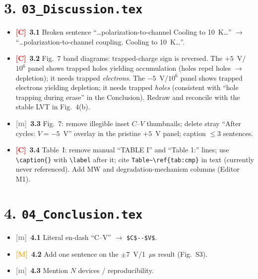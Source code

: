 \documentclass[10pt,a4paper]{article}
\newcommand{\C}{\textcolor{red}{\textbf{[C]}}}
\newcommand{\M}{\textcolor{orange}{\textbf{[M]}}}
\newcommand{\m}{\textcolor{gray}{\textbf{[m]}}}
\begin{document}
\section*{3. \texttt{03\_Discussion.tex}}
\begin{itemize}
\item \C\ \textbf{3.1} Broken sentence ``\ldots polarization-to-channel Cooling to 10~K\ldots'' $\rightarrow$ ``\ldots polarization-to-channel coupling. Cooling to 10~K\ldots''.
\item \C\ \textbf{3.2} Fig.~7 band diagrams: trapped-charge sign is reversed. The $+5$~V/$10^{6}$ panel shows trapped holes yielding accumulation (holes repel holes $\rightarrow$ depletion); it needs trapped \emph{electrons}. The $-5$~V/$10^{6}$ panel shows trapped electrons yielding depletion; it needs trapped \emph{holes} (consistent with ``hole trapping during erase'' in the Conclusion). Redraw and reconcile with the stable LVT in Fig.~4(b).
\item \m\ \textbf{3.3} Fig.~7: remove illegible inset $C$--$V$ thumbnails; delete stray ``After cycles: $V=-5$~V'' overlay in the pristine $+5$~V panel; caption $\le$3 sentences.
\item \C\ \textbf{3.4} Table~I: remove manual ``TABLE I'' and ``Table 1:'' lines; use \verb|\caption{}| with \verb|\label| after it; cite \verb|Table~\ref{tab:cmp}| in text (currently never referenced). Add MW and degradation-mechanism columns (Editor M1).
\end{itemize}

\section*{4. \texttt{04\_Conclusion.tex}}
\begin{itemize}
\item \m\ \textbf{4.1} Literal en-dash ``C–V'' $\rightarrow$ \verb|$C$--$V$|.
\item \M\ \textbf{4.2} Add one sentence on the $\pm7$~V/1~$\mu$s result (Fig.~S3).
\item \m\ \textbf{4.3} Mention $N$ devices / reproducibility.
\end{itemize}

\end{document}
